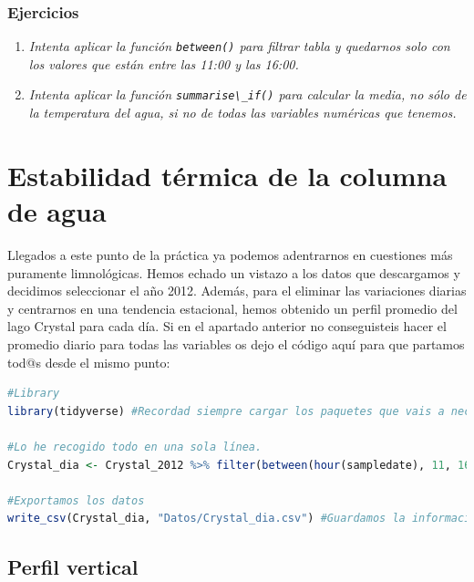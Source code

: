 \documentclass[
]{book}
\newcommand{\passthrough}[1]{#1}
\providecommand{\tightlist}{%
  \setlength{\itemsep}{0pt}\setlength{\parskip}{0pt}}
\begin{document}
\hypertarget{ejercicios-3}{%
\subsection{Ejercicios}\label{ejercicios-3}}

\begin{enumerate}
\def\labelenumi{\arabic{enumi}.}
\tightlist
\item
  \emph{Intenta aplicar la función \passthrough{\lstinline!between()!} para filtrar tabla y quedarnos solo con los valores que están entre las 11:00 y las 16:00.}
\item
  \emph{Intenta aplicar la función \passthrough{\lstinline!summarise\_if()!} para calcular la media, no sólo de la temperatura del agua, si no de todas las variables numéricas que tenemos.}
\end{enumerate}

\hypertarget{Termoclina}{%
\chapter{Estabilidad térmica de la columna de agua}\label{Termoclina}}

Llegados a este punto de la práctica ya podemos adentrarnos en cuestiones más puramente limnológicas. Hemos echado un vistazo a los datos que descargamos y decidimos seleccionar el año 2012. Además, para el eliminar las variaciones diarias y centrarnos en una tendencia estacional, hemos obtenido un perfil promedio del lago Crystal para cada día. Si en el apartado anterior no conseguisteis hacer el promedio diario para todas las variables os dejo el código aquí para que partamos tod@s desde el mismo punto:

\begin{lstlisting}[language=R]
#Library
library(tidyverse) #Recordad siempre cargar los paquetes que vais a necesitar al inicio del script

#Lo he recogido todo en una sola línea.
Crystal_dia <- Crystal_2012 %>% filter(between(hour(sampledate), 11, 16)) %>% group_by(daynum, depth_calculated) %>% summarise_if(is.numeric, mean, na.rm = TRUE)

#Exportamos los datos
write_csv(Crystal_dia, "Datos/Crystal_dia.csv") #Guardamos la información en un archivo
\end{lstlisting}

\hypertarget{perfil-vertical}{%
\section{Perfil vertical}\label{perfil-vertical}}
\end{document}
